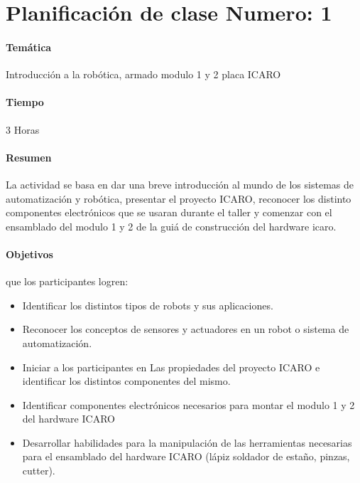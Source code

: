 \chapter*{Planificación de clase Numero: 1}
\subsubsection{Temática}
Introducción a la robótica, armado modulo 1 y 2 placa ICARO

\subsubsection{Tiempo}
3 Horas

\subsubsection{Resumen}

La actividad se basa en dar una breve introducción al mundo de los sistemas de automatización y robótica, presentar el proyecto ICARO, reconocer los distinto componentes electrónicos que se usaran durante el taller y comenzar con el ensamblado del modulo 1 y 2 de la guiá de construcción del hardware icaro.

\subsubsection{Objetivos}
que los participantes logren:
\begin{itemize}
  \item Identificar los distintos tipos de robots y sus aplicaciones.
  \item Reconocer los conceptos de sensores y actuadores en un robot o sistema de automatización.
  \item Iniciar a los participantes en Las propiedades del proyecto ICARO e identificar los distintos componentes del mismo.
  \item Identificar componentes electrónicos necesarios para montar el modulo 1 y 2 del hardware ICARO
  \item Desarrollar habilidades para la manipulación de las herramientas necesarias para el ensamblado del hardware ICARO (lápiz soldador de estaño, pinzas, cutter).
  \end{itemize}

